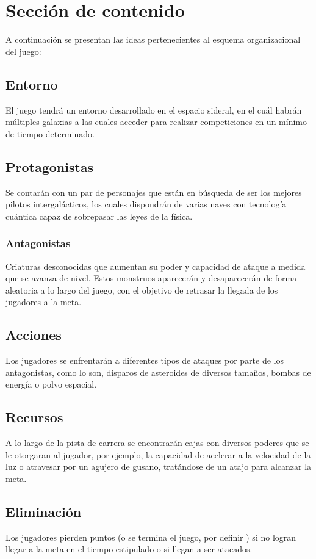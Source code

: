\documentclass{article}
\begin{document}
\section{Sección de contenido} \label{contenido}
A continuación se presentan las ideas pertenecientes al esquema organizacional del juego:

\subsection{Entorno}
El juego tendrá un entorno desarrollado en el espacio sideral, en el cuál habrán múltiples galaxias a las cuales acceder para realizar competiciones en un mínimo de tiempo determinado.
\subsection{Protagonistas}
Se contarán con un par de personajes que están en búsqueda de ser los mejores pilotos intergalácticos, los cuales dispondrán de varias naves con tecnología cuántica capaz de sobrepasar las leyes de la física.

\subsubsection{Antagonistas}
Criaturas desconocidas que aumentan su poder y capacidad de ataque a medida que se avanza de nivel. Estos monstruos aparecerán y desaparecerán de forma aleatoria a lo largo del juego, con el objetivo de retrasar la llegada de los jugadores a la meta.

\subsection{Acciones}
Los jugadores se enfrentarán a diferentes tipos de ataques por parte de los antagonistas, como lo son, disparos de asteroides de diversos tamaños, bombas de energía o polvo espacial.

\subsection{Recursos}
A lo largo de la pista de carrera se encontrarán cajas con diversos poderes que se le otorgaran al jugador, por ejemplo, la capacidad de acelerar a la velocidad de la luz o atravesar por un agujero de gusano, tratándose de un atajo para alcanzar la meta.

\subsection{Eliminación}
Los jugadores pierden puntos (o se termina el juego, por definir ) si no logran llegar a la meta en el tiempo estipulado o si llegan a ser atacados.
\end{document}
